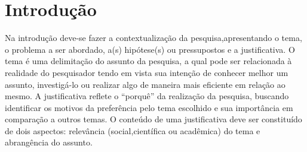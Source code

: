 \chapter[Introdução]{Introdução}

Na introdução deve-se fazer a contextualização da pesquisa,apresentando o tema, o problema a ser abordado, a(s) hipótese(s) ou pressupostos e a justificativa. O tema é uma delimitação do assunto da pesquisa, a qual pode ser relacionada à realidade do pesquisador tendo em vista sua intenção de conhecer melhor um assunto, investigá-lo ou realizar algo de maneira mais eficiente em relação ao mesmo. A justificativa reflete o “porquê” da realização da pesquisa, buscando identificar os motivos da preferência pelo tema escolhido e sua importância em comparação a outros temas. O conteúdo de uma justificativa deve ser constituído de dois aspectos: relevância (social,científica ou acadêmica) do tema e abrangência do assunto.
